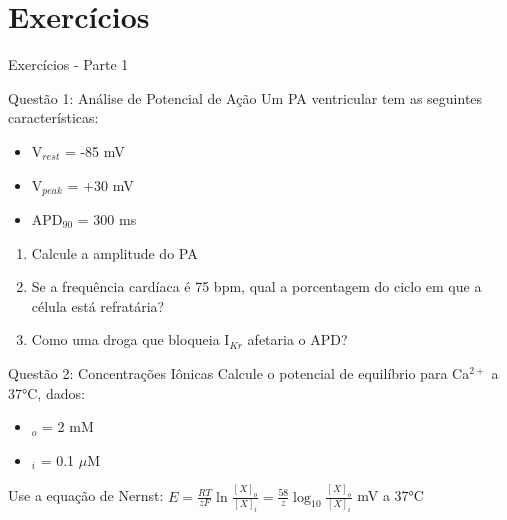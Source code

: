 \section{Exercícios}

\begin{frame}{Exercícios - Parte 1}
\begin{block}{Questão 1: Análise de Potencial de Ação}
Um PA ventricular tem as seguintes características:
\begin{itemize}
    \item V$_{rest}$ = -85 mV
    \item V$_{peak}$ = +30 mV
    \item APD$_{90}$ = 300 ms
\end{itemize}
\begin{enumerate}
    \item Calcule a amplitude do PA
    \item Se a frequência cardíaca é 75 bpm, qual a porcentagem do ciclo em que a célula está refratária?
    \item Como uma droga que bloqueia I$_{Kr}$ afetaria o APD?
\end{enumerate}
\end{block}

\begin{block}{Questão 2: Concentrações Iônicas}
Calcule o potencial de equilíbrio para Ca$^{2+}$ a 37°C, dados:
\begin{itemize}
    \item [Ca$^{2+}$]$_o$ = 2 mM
    \item [Ca$^{2+}$]$_i$ = 0.1 $\mu$M
\end{itemize}
Use a equação de Nernst: $E = \frac{RT}{zF}\ln\frac{[X]_o}{[X]_i} = \frac{58}{z}\log_{10}\frac{[X]_o}{[X]_i}$ mV a 37°C
\end{block}
\end{frame}

